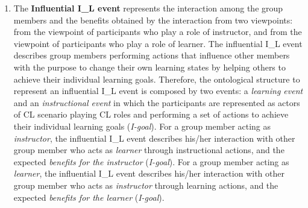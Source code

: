 \begin{enumerate} [label=(\alph*)]
\item
The \textbf{Influential I\_L event} represents the interaction among the group members and the benefits obtained by the interaction from two viewpoints: from the viewpoint of participants who play a role of instructor, and from the viewpoint of participants who play a role of learner.
The influential I\_L event describes group members performing actions that influence other members with the purpose to change their own learning states by helping others to achieve their individual learning goals.
Therefore, the ontological structure to represent an influential I\_L event is composed by two events:
a \emph{learning event} and an \emph{instructional event} in which the participants are represented as actors of CL scenario playing CL roles and performing a set of actions to achieve their individual learning goals (\emph{I-goal}).
For a group member acting as \emph{instructor}, the influential I\_L event describes his/her interaction with other group member who acts as \emph{learner} through instructional actions, and the expected \emph{benefits for the instructor} (\emph{I-goal}).
For a group member acting as \emph{learner}, the influential I\_L event describes his/her interaction with other group member who acts as \emph{instructor} through learning actions, and the expected \emph{benefits for the learner} (\emph{I-goal}).
\end{enumerate}

